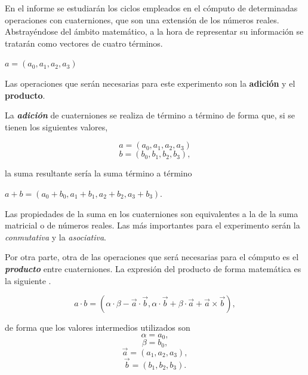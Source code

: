 \documentclass[conference]{IEEEtran}
\begin{document}
En el informe se estudiarán los ciclos empleados en el cómputo de determinadas operaciones con cuaterniones, que son una extensión de los números reales. Abstrayéndose del ámbito matemático, a la hora de representar su información se tratarán como vectores de cuatro términos.

\begin{center}
    $a = (a_{0}, a_{1}, a_{2}, a_{3})$
\end{center}

Las operaciones que serán necesarias para este experimento son la \textbf{adición} y el \textbf{producto}.

La \textbf{\textit{adición}} de cuaterniones se realiza de término a término de forma que, si se tienen los siguientes valores,

\begin{equation*}
    a = (a_{0}, a_{1}, a_{2}, a_{3})
\end{equation*}
\begin{equation*}
    b = (b_{0}, b_{1}, b_{2}, b_{3}),
\end{equation*}

la suma resultante sería la suma término a término

\begin{center}
    $a + b= (a_{0} + b_{0}, a_{1} + b_{1}, a_{2} + b_{2}, a_{3} + b_{3})$.
\end{center}

Las propiedades de la suma en los cuaterniones son equivalentes a la de la suma matricial o de números reales. Las más importantes para el experimento serán la \textit{conmutativa} y la \textit{asociativa}.

Por otra parte, otra de las operaciones que será necesarias para el cómputo es el \textit{\textbf{producto}} entre cuaterniones. La expresión del producto de forma matemática es la siguiente \cite{paperOperacionesCuaterniones}.

\begin{equation*}
    a\cdot b = (\alpha \cdot \beta - \vec{a} \cdot \vec{b}, \alpha \cdot \vec{b} + \beta \cdot \vec{a} + \vec{a} \times \vec{b}),
\end{equation*}

de forma que los valores intermedios utilizados son
\begin{equation*}
    \alpha = a_{0},
\end{equation*}
\begin{equation*}
    \beta = b_{0},
\end{equation*}
\begin{equation*}
    \vec{a} = (a_{1}, a_{2}, a_{3}),
\end{equation*}
\begin{equation*}
    \vec{b} = (b_{1}, b_{2}, b_{3}).
\end{equation*}
\end{document}
